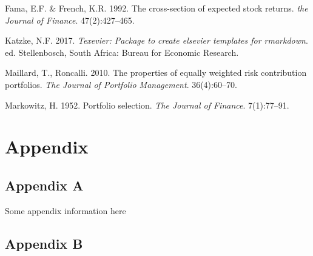\documentclass[11pt,preprint, authoryear]{elsarticle}
\numberwithin{equation}{section}
\numberwithin{figure}{section}
\numberwithin{table}{section}
\begin{document}
\leavevmode\hypertarget{ref-fama1992}{}%
Fama, E.F. \& French, K.R. 1992. The cross-section of expected stock
returns. \emph{the Journal of Finance}. 47(2):427--465.

\leavevmode\hypertarget{ref-Texevier}{}%
Katzke, N.F. 2017. \emph{Texevier: Package to create elsevier templates
for rmarkdown}. ed. Stellenbosch, South Africa: Bureau for Economic
Research.

\leavevmode\hypertarget{ref-maillard2010}{}%
Maillard, T., Roncalli. 2010. The properties of equally weighted risk
contribution portfolios. \emph{The Journal of Portfolio Management}.
36(4):60--70.

\leavevmode\hypertarget{ref-markowitz}{}%
Markowitz, H. 1952. Portfolio selection. \emph{The Journal of Finance}.
7(1):77--91.

\newpage

\hypertarget{appendix}{%
\section*{Appendix}\label{appendix}}

\hypertarget{appendix-a}{%
\subsection*{Appendix A}\label{appendix-a}}

Some appendix information here

\hypertarget{appendix-b}{%
\subsection*{Appendix B}\label{appendix-b}}


\end{document}
